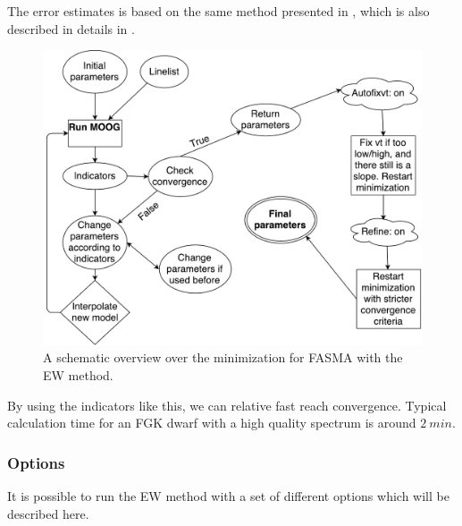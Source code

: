 \documentclass{aa}
\begin{document}
The error estimates is based on the same method presented in
\citet{Gonzalez2000}, which is also described in details in
\citet{Santos2003,Andreasen2016}.

\begin{figure}[tpb]
    \centering
    \includegraphics[width=1.0\linewidth,natwidth=700,natheight=650]{figures/FASMA_minimization.pdf}
    \caption{A schematic overview over the minimization for FASMA with the
    EW method.}
    \label{fig:FASMA_minimization}
\end{figure}

By using the indicators like this, we can relative fast reach convergence.
Typical calculation time for an FGK dwarf with a high quality spectrum is around
$\SI{2}{min}$.

\subsubsection{Options}
\label{subs:EWoptions}
It is possible to run the EW method with a set of different options which
will be described here.
\end{document}
